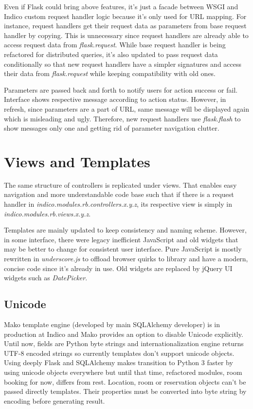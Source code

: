 Even if Flask could bring above features, it's just a facade between WSGI and Indico custom request handler logic because it's only used for URL mapping. For instance, request handlers get their request data as parameters from base request handler by copying. This is unnecessary since request handlers are already able to access request data from \textit{flask.request}. While base request handler is being refactored for distributed queries, it's also updated to pass request data conditionally so that new request handlers have a simpler signatures and access their data from \textit{flask.request} while keeping compatibility with old ones.

Parameters are passed back and forth to notify users for action success or fail. Interface shows respective message according to action status. However, in refresh, since parameters are a part of URL, same message will be displayed again which is misleading and ugly. Therefore, new request handlers use \textit{flask.flash} to show messages only one and getting rid of parameter navigation clutter.

\section{Views and Templates}

The same structure of controllers is replicated under views. That enables easy navigation and more understandable code base such that if there is a request handler in \textit{indico.modules.rb.controllers.x.y.z}, its respective view is simply in \textit{indico.modules.rb.views.x.y.z}.

Templates are mainly updated to keep consistency and naming scheme. However, in some interface, there were legacy inefficient JavaScript and old widgets that may be better to change for consistent user interface. Pure JavaScript is mostly rewritten in \textit{underscore.js} to offload browser quirks to library and have a modern, concise code since it's already in use. Old widgets are replaced by jQuery UI widgets such as \textit{DatePicker}.

\subsection{Unicode}

Mako template engine (developed by main SQLAlchemy developer) is in production at Indico and Mako provides an option to disable Unicode explicitly. Until now, fields are Python byte strings and internationalization engine returns UTF-8 encoded strings so currently templates don't support unicode objects. Using deeply Flask and SQLAlchemy makes transition to Python 3 faster by using unicode objects everywhere but until that time, refactored modules, room booking for now, differs from rest. Location, room or reservation objects can't be passed directly templates. Their properties must be converted into byte string by encoding before generating result.

